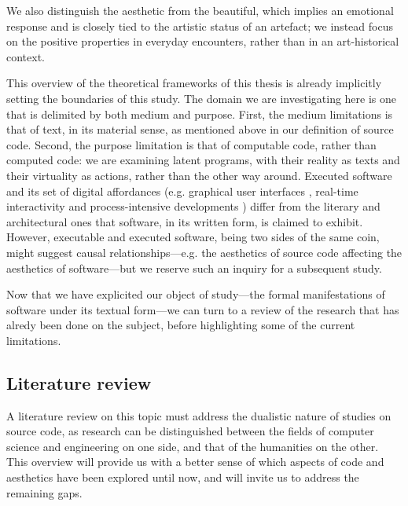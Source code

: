 We also distinguish the aesthetic from the beautiful, which implies an emotional response and is closely tied to the artistic status of an artefact; we instead focus on the positive properties in everyday encounters, rather than in an art-historical context.

This overview of the theoretical frameworks of this thesis is already implicitly setting the boundaries of this study. The domain we are investigating here is one that is delimited by both medium and purpose. First, the medium limitations is that of text, in its material sense, as mentioned above in our definition of source code. Second, the purpose limitation is that of computable code, rather than computed code: we are examining latent programs, with their reality as texts and their virtuality as actions, rather than the other way around. Executed software and its set of digital affordances (e.g. graphical user interfaces \citep{gelernter_machine_1998}, real-time interactivity \citep{laurel_computers_1993} and process-intensive developments \citep{murray_hamlet_1998}) differ from the literary and architectural ones that software, in its written form, is claimed to exhibit. However, executable and executed software, being two sides of the same coin, might suggest causal relationships—e.g. the aesthetics of source code affecting the aesthetics of software—but we reserve such an inquiry for a subsequent study.

Now that we have explicited our object of study—the formal manifestations of software under its textual form—we can turn to a review of the research that has alredy been done on the subject, before highlighting some of the current limitations.

\subsection{Literature review}
\label{subsec:literature-review}

A literature review on this topic must address the dualistic nature of studies on source code, as research can be distinguished between the fields of computer science and engineering on one side, and that of the humanities on the other. This overview will provide us with a better sense of which aspects of code and aesthetics have been explored until now, and will invite us to address the remaining gaps.

